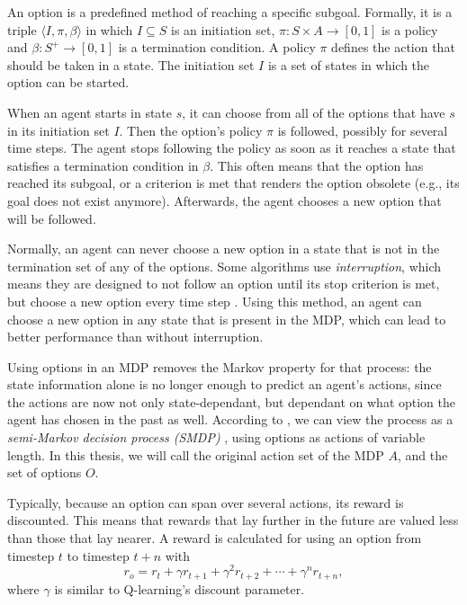 An option is a predefined method of reaching a specific subgoal. Formally, it is
a triple $\langle I, \pi, \beta \rangle$ in which $I \subseteq S$ is an
initiation set, $\pi: S \times A \rightarrow [0, 1]$ is a policy and $\beta: S^+
\rightarrow [0,1]$ is a termination condition.  A policy $\pi$ defines the
action that should be taken in a state. The initiation set $I$ is a set of
states in which the option can be started. 

When an agent starts in state $s$, it can choose from all of the options that
have $s$ in its initiation set $I$.  Then the option's policy $\pi$ is followed,
possibly for several time steps. The agent stops following the policy as soon as
it reaches a state that satisfies a termination condition in $\beta$. This often
means that the option has reached its subgoal, or a criterion is met that
renders the option obsolete (e.g., its goal does not exist anymore). Afterwards,
the agent chooses a new option that will be followed.

Normally, an agent can never choose a new option in a state that is not in the
termination set of any of the options. Some algorithms use \emph{interruption},
which means they are designed to not follow an option until its stop criterion
is met, but choose a new option every time step \cite{sutton1999between,
precup2000temporal}. Using this method, an agent can choose a new option in any
state that is present in the MDP, which can lead to better performance than
without interruption.

Using options in an MDP removes the Markov property for that process: the state
information alone is no longer enough to predict an agent's actions, since the
actions are now not only state-dependant, but dependant on what option the agent
has chosen in the past as well. According to \cite{sutton1999between}, we can
view the process as a \emph{semi-Markov decision process (SMDP)}
\cite{duff1995reinforcement}, using options as actions of variable length. In
this thesis, we will call the original action set of the MDP $A$, and the set of
options $O$.

Typically, because an option can span over several actions, its reward is
discounted. This means that rewards that lay further in the future are valued
less than those that lay nearer. A reward is calculated for using an option from
timestep $t$ to timestep $t+n$ with
\begin{equation}
	\label{eq:option-reward}
	r_o = r_{t} + \gamma r_{t+1} + \gamma^2 r_{t+2} + \cdots + \gamma^n r_{t+n},
\end{equation}
where $\gamma$ is similar to Q-learning's discount parameter.

